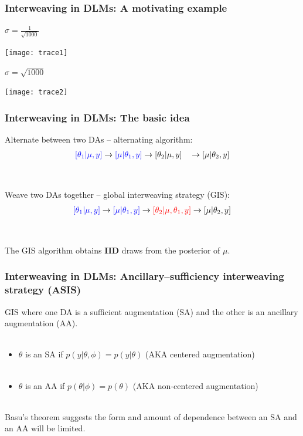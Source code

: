 \documentclass[xcolor=dvipsnames]{beamer}
\begin{document}
\begin{frame}
\frametitle{Interweaving in DLMs: A motivating example}
$\sigma=\frac{1}{\sqrt{1000}}$
\begin{center}
\texttt{[image: trace1]}\\
\end{center}
$\sigma=\sqrt{1000}$
\begin{center}
\texttt{[image: trace2]}
\end{center}
\end{frame}

\begin{frame}
\frametitle{Interweaving in DLMs: The basic idea}
Alternate between two DAs -- alternating algorithm:
\begin{align*}
{\color{blue}[\theta_1|\mu,y]} \to {\color{blue}[\mu|\theta_1,y]} \to [\theta_2|\mu,y]\phantom{\theta_1} \to [\mu|\theta_2,y]
\end{align*}\\~\\
\pause Weave two DAs together -- global interweaving strategy (GIS):
\begin{align*}
{\color{blue}[\theta_1|\mu,y]} \to {\color{blue}[\mu|\theta_1,y]} \to {\color{red}[\theta_2|\mu,\theta_1,y]} \to [\mu|\theta_2,y]
\end{align*}\\~\\\pause
The GIS algorithm obtains {\bf IID} draws from the posterior of $\mu$.
\end{frame}

\begin{frame}
\frametitle{Interweaving in DLMs: Ancillary--sufficiency interweaving strategy (ASIS)}
GIS where one DA is a sufficient augmentation (SA) and the other is an ancillary augmentation (AA).\\~\\
\begin{itemize}
\item$\theta$ is an SA if $p(y|\theta,\phi)=p(y|\theta)$ (AKA centered augmentation)\\~\\
\item$\theta$ is an AA if $p(\theta|\phi)=p(\theta)$ (AKA non-centered augmentation)\\~\\
\end{itemize}
\pause Basu's theorem suggests the form and amount of dependence between an SA and an AA will be limited.
\end{frame}
\end{document}
